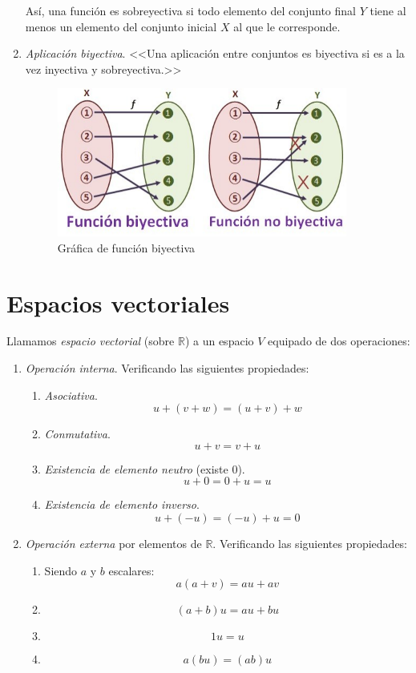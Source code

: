 \documentclass[11pt, oneside, titlepage]{article}
\begin{document}
\begin{enumerate}
Así, una función es sobreyectiva si todo elemento del conjunto final $Y$ tiene al menos un elemento del conjunto inicial $X$ al que le corresponde.
\item \emph{Aplicación biyectiva}. <<Una aplicación entre conjuntos es biyectiva si es a la vez inyectiva y sobreyectiva.>>
\begin{figure}[htp]
\centering
\includegraphics[width=0.9\textwidth]{recursos/fbiyectiva.png}
\caption{Gráfica de función biyectiva}
\label{}
\end{figure}
\end{enumerate}

\section{Espacios vectoriales}
Llamamos \emph{espacio vectorial} (sobre $\mathds{R}$) a un espacio $V$ equipado de dos operaciones:

\begin{enumerate}
\item \emph{Operación interna}. Verificando las siguientes propiedades:
\begin{enumerate}
\item \emph{Asociativa}. \[u+(v+w)=(u+v)+w\]
\item \emph{Conmutativa}. \[u+v=v+u\]
\item \emph{Existencia de elemento neutro} (existe 0). \[u+0=0+u=u\]
\item \emph{Existencia de elemento inverso}. \[u+(-u)=(-u)+u=0\]
\end{enumerate}
\item \emph{Operación externa} por elementos de $\mathds{R}$. Verificando las siguientes propiedades:
\begin{enumerate}
\item Siendo $a$ y $b$ escalares: \[a(a+v)=au+av\]
\item \[(a+b)u=au+bu\]
\item \[1u = u\]
\item \[a(bu)=(ab)u\]
\end{enumerate}
\end{enumerate}
\end{document}

